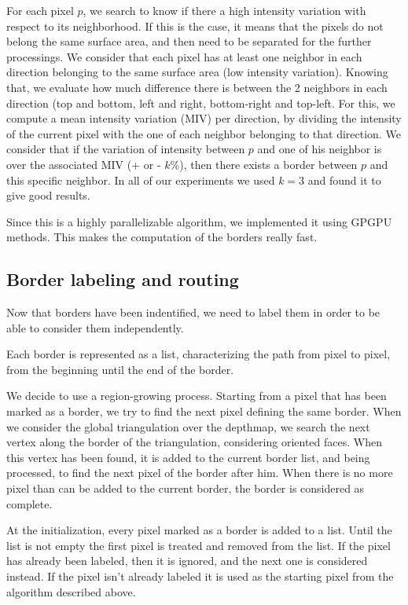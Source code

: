 \documentclass[11pt,fleqn]{book} %
\begin{document}
For each pixel $p$, we search to know if there a high intensity variation with respect to its neighborhood. If this is the case, it means that the pixels do not belong the same surface area, and then need to be separated for the further processings.
We consider that each pixel has at least one neighbor in each direction belonging to the same surface area (low intensity variation). Knowing that, we evaluate how much difference there is between the 2 neighbors in each direction (top and bottom, left and right, bottom-right and top-left.
For this, we compute a mean intensity variation (MIV) per direction, by dividing the intensity of the current pixel with the one of each neighbor belonging to that direction. We consider that if the variation of intensity between $p$ and one of his neighbor is over the associated MIV (+ or - $k$\%), then there exists a border between $p$ and this specific neighbor. In all of our experiments we used $k = 3$ and found it to give good results.

Since this is a highly parallelizable algorithm, we implemented it using GPGPU methods. This makes the computation of the borders really fast.

\subsection{Border labeling and routing}
Now that borders have been indentified, we need to label them in order to be able to consider them independently. 

Each border is represented as a list, characterizing the path from pixel to pixel, from the beginning until the end of the border.

We decide to use a region-growing process. Starting from a pixel that has been marked as a border, we try to find the next pixel defining the same border. When we consider the global triangulation over the depthmap, we search the next vertex along the border of the triangulation, considering oriented faces.
When this vertex has been found, it is added to the current border list, and being processed, to find the next pixel of the border after him.
When there is no more pixel than can be added to the current border, the border is considered as complete.

At the initialization, every pixel marked as a border is added to a list. Until the list is not empty the first pixel is treated and removed from the list. If the pixel has already been labeled, then it is ignored, and the next one is considered instead. If the pixel isn't already labeled it is used as the starting pixel from the algorithm described above.
\end{document}
